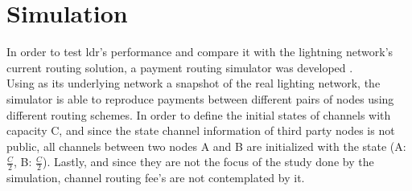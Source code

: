 \section{Simulation}

In order to test \acrshort{ldr}'s performance and compare it with the lightning network's current routing solution, a payment routing simulator was developed \cite{simulator}. \\
Using as its underlying network a snapshot of the real lighting network, the simulator is able to reproduce payments between different pairs of nodes using different routing schemes. In order to define the initial states of channels with capacity C, and since the state channel information of third party nodes is not public, all channels between two nodes A and B are initialized with the state (A: $\frac{C}{2}$, B: $\frac{C}{2}$). Lastly, and since they are not the focus of the study done by the simulation, channel routing fee's are not contemplated by it.\\

